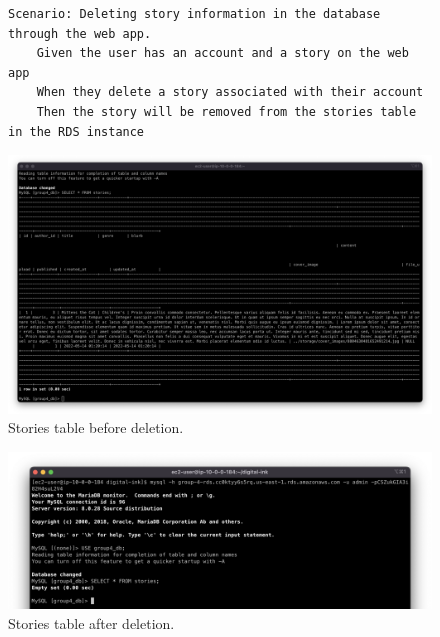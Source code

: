 \clearpage

\begin{figure}[!htbp]
    \centering
    \begin{verbatim}
Scenario: Deleting story information in the database through the web app.
    Given the user has an account and a story on the web app
    When they delete a story associated with their account
    Then the story will be removed from the stories table in the RDS instance
    \end{verbatim}
    \label{fig:delete-story-data}
\end{figure}

\begin{figure}[!htbp]
    \centering
    \includegraphics[width=\textwidth]{resources/rds/rds-testing-stories-after}
    \caption{Stories table before deletion.}
    \label{fig:rds-testing-before-story-deletion}
\end{figure}

\begin{figure}[!htbp]
    \centering
    \includegraphics[width=\textwidth]{resources/rds/rds-testing-stories-before}
    \caption{Stories table after deletion.}
    \label{fig:rds-testing-after-story-deletion}
\end{figure}

